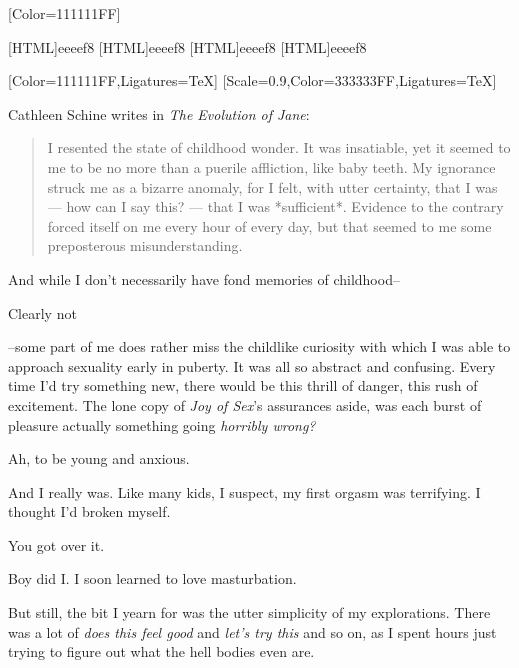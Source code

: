 \label{sex:sex}
\renewfontfamily{}[Color=111111FF]

[HTML]{eeeef8}
[HTML]{eeeef8}
[HTML]{eeeef8}
[HTML]{eeeef8}

\begin{paracol}{2}
\begin{leftcolumn}

[Color=111111FF,Ligatures=TeX]
\renewfontfamily{}[Scale=0.9,Color=333333FF,Ligatures=TeX]

\noindent Cathleen Schine writes in \emph{The Evolution of Jane}:

\begin{quotation}
  \noindent I resented the state of childhood wonder.  It was insatiable, yet it seemed to me to be no more than a puerile affliction, like baby teeth.  My ignorance struck me as a bizarre anomaly, for I felt, with utter certainty, that I was --- how can I say this? --- that I was *sufficient*.  Evidence to the contrary forced itself on me every hour of every day, but that seemed to me some preposterous misunderstanding.
\end{quotation}
And while I don't necessarily have fond memories of childhood--

\begin{ally}
Clearly not
\end{ally}
--some part of me does rather miss the childlike curiosity with which I was able to approach sexuality early in puberty. It was all so abstract and confusing. Every time I'd try something new, there would be this thrill of danger, this rush of excitement. The lone copy of \emph{Joy of Sex}'s assurances aside, was each burst of pleasure actually something going \emph{horribly wrong?}

\begin{ally}
Ah, to be young and anxious.
\end{ally}
And I really was. Like many kids, I suspect, my first orgasm was terrifying. I thought I'd broken myself.

\begin{ally}
You got over it.
\end{ally}
Boy did I. I soon learned to love masturbation.

But still, the bit I yearn for was the utter simplicity of my explorations. There was a lot of \emph{does this feel good} and \emph{let's try this} and so on, as I spent hours just trying to figure out what the hell bodies even are.


\end{leftcolumn}
\end{paracol}
